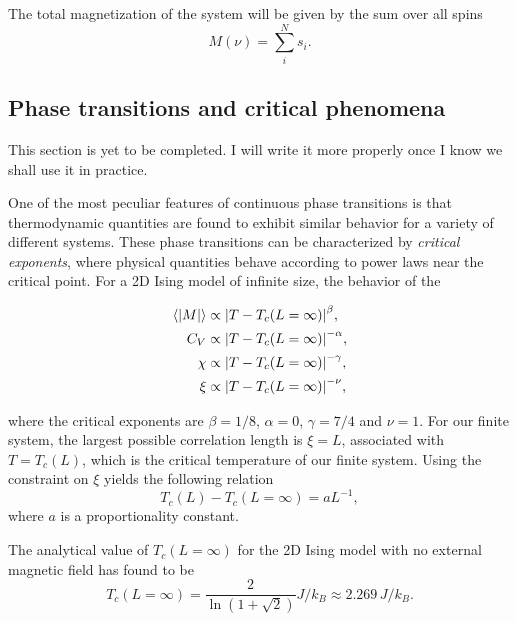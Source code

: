 The total magnetization of the system will be given by the sum over all spins 
\begin{equation}\label{eq:total_magnetization}
    M(\nu) = \sum_{i}^N s_i.
\end{equation}

\subsection{Phase transitions and critical phenomena}\label{subsec_theory:PT_critical_phenomena}
\alert{This section is yet to be completed. I will write it more properly once I know we shall use it in practice.}

One of the most peculiar features of continuous phase transitions is that thermodynamic quantities are found to exhibit similar behavior for a variety of different systems. These phase transitions can be characterized by \textit{critical exponents}, where physical quantities behave according to power laws near the critical point.  For a 2D Ising model of infinite size, the behavior of the 

\begin{align}
    \expval{\abs{M}} & \propto \abs{T - T_c(L=\infty)}^\beta, \label{eq:crit_expo_mag} \\
    C_V & \propto \abs{T - T_c(L=\infty)}^{-\alpha}, \label{eq:crit_expo_heatcap} \\ 
    \chi & \propto \abs{T - T_c(L=\infty)}^{-\gamma}, \label{eq:crit_expo_mag_susc} \\ 
    \xi & \propto \abs{T - T_c(L=\infty)}^{-\nu}, \label{eq:crit_expo_corr_length}
\end{align}


where the critical exponents are $\beta=1/8$, $\alpha=0$, $\gamma=7/4$ and $\nu=1$. For our finite system, the largest possible correlation length is $\xi=L$, associated with $T=T_c(L)$, which is the critical temperature of our finite system. Using the constraint on $\xi$ yields the following relation 
\begin{equation}
    T_c(L) - T_c(L=\infty) = aL^{-1}, \label{eq:finite_size_scaling_relation}
\end{equation}  
where $a$ is a proportionality constant. 

The analytical value of $T_c(L=\infty)$ for the 2D Ising model with no external magnetic field has found to be \cite{Onsager_Ising2D}
\begin{equation}
    T_c(L=\infty) = \frac{2}{\ln(1+\sqrt{2})} J/k_B \approx 2.269\,J/k_B. \label{eq:onsager_critical_temperature}
\end{equation}


